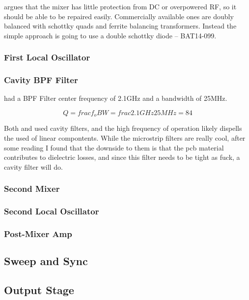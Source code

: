 \cite{lea} argues that the mixer has little protection from DC or overpowered
RF, so it should be able to be repaired easily. Commercially available ones are
doubly balanced with schottky quads and ferrite balancing transformers. Instead
the simple approach is going to use a double schottky diode -- BAT14-099.

\subsubsection{First Local Oscillator}

\subsubsection{Cavity BPF Filter}

\cite{lea} had a BPF Filter center frequency of 2.1GHz and a bandwidth of 25MHz.

\begin{equation}
	Q = frac{f_o}{BW}
	= frac{2.1GHz}{25MHz}
	= 84
\end{equation}

Both \cite{qsl} and \cite{lea} used cavity filters, and the high frequency of
operation likely dispells the used of linear compontents. While the microstrip
filters are really cool, after some reading I found that the downside to them is
that the pcb material contributes to dielectric losses, and since this filter
needs to be tight as fuck, a cavity filter will do.

\subsubsection{Second Mixer}

\subsubsection{Second Local Oscillator}

\subsubsection{Post-Mixer Amp}

\subsection{Sweep and Sync}

\subsection{Output Stage}

